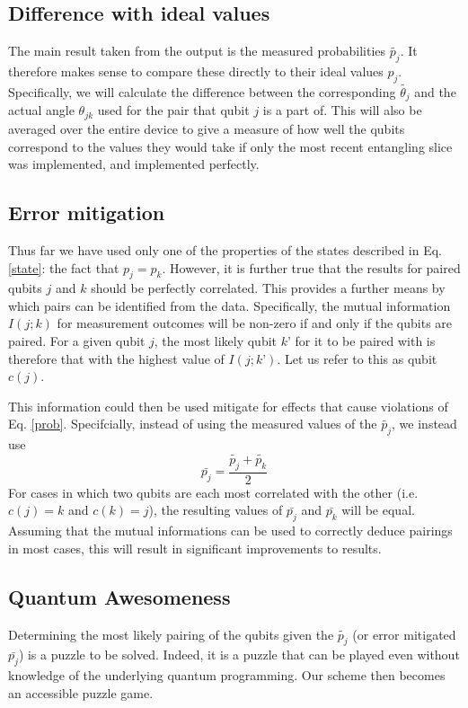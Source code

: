 \documentclass[aps,prl,twocolumn,showpacs,preprintnumbers]{revtex4-1}
\newcommand{\be}{\begin{equation}}
\newcommand{\ee}{\end{equation}}
\begin{document}
\subsection{Difference with ideal values}

The main result taken from the output is the measured probabilities $\tilde{p_j}$. It therefore makes sense to compare these directly to their ideal values $p_j$. Specifically, we will calculate the difference between the corresponding $\tilde{\theta_j}$ and the actual angle $\theta_{jk}$ used for the pair that qubit $j$ is a part of. This will also be averaged over the entire device to give a measure of how well the qubits correspond to the values they would take if only the most recent entangling slice was implemented, and implemented perfectly.

\subsection{Error mitigation}

Thus far we have used only one of the properties of the states described in Eq. \ref{state}: the fact that $p_j=p_k$. However, it is further true that the results for paired qubits $j$ and $k$ should be perfectly correlated. This provides a further means by which pairs can be identified from the data. Specifically, the mutual information $I(j;k)$ for measurement outcomes will be non-zero if and only if the qubits are paired. For a given qubit $j$, the most likely qubit $k’$ for it to be paired with is therefore that with the highest value of $I(j;k’)$. Let us refer to this as qubit $c(j)$.

This information could then be used mitigate for effects that cause violations of Eq. \ref{prob}. Specifcially, instead of using the measured values of the $\tilde{p_j}$, we instead use
\be
\bar{p_j} = \frac{ \tilde{p_j} + \tilde{p_k} }{2}
\ee
For cases in which two qubits are each most correlated with the other (i.e. $c(j)=k$ and $c(k)=j$), the resulting values of $\bar{p_j}$ and $\bar{p_k}$ will be equal. Assuming that the mutual informations can be used to correctly deduce pairings in most cases, this will result in significant improvements to results.

\subsection{Quantum Awesomeness}

Determining the most likely pairing of the qubits given the $\tilde{p_j}$ (or error mitigated $\bar{p_j}$) is a puzzle to be solved. Indeed, it is a puzzle that can be played even without knowledge of the underlying quantum programming. Our scheme then becomes an accessible puzzle game.
\end{document}

